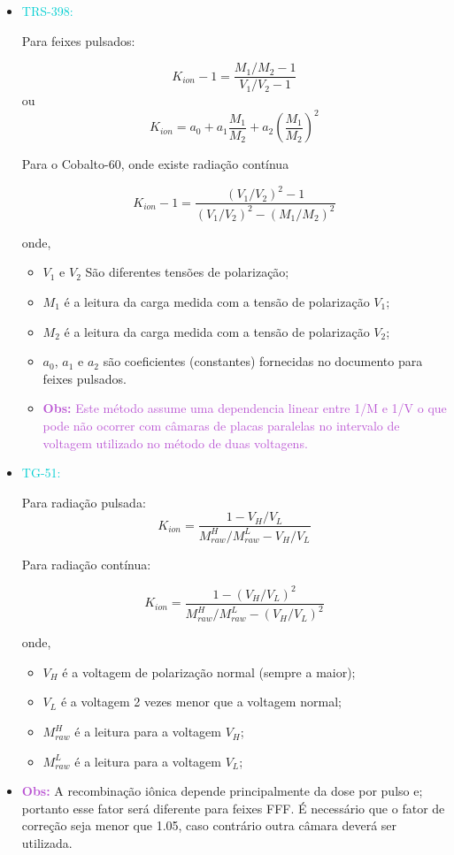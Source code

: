 \documentclass[11pt,a4paper]{article}
\newcounter{exemplo}
\begin{document}
	\begin{exemplo}
		\begin{itemize}
			\item \textcolor{DarkTurquoise}{TRS-398:}
			
			Para feixes pulsados:

				$$K_{ion} - 1 = \frac{M_1/M_2 - 1}{V_1/V_2 - 1}$$
			ou
				$$K_{ion} = a_0 + a_1\frac{M_1}{M_2} + a_2\left(\frac{M_1}{M_2}\right)^2$$

			Para o Cobalto-60, onde existe radiação contínua

				$$K_{ion} - 1 = \frac{(V_1/V_2)^2- 1}{(V_1/V_2)^2 - (M_1/M_2)^2}$$

			onde,
			\begin{itemize}[label=\textcolor{CarnationPink}{$\star$}]
				\item $V_1$ e $V_2$ São diferentes tensões de polarização;
				\item $M_1$ é a leitura da carga medida com a tensão de polarização $V_1$;
				\item $M_2$ é a leitura da carga medida com a tensão de polarização $V_2$;
				\item $a_0$, $a_1$ e $a_2$ são coeficientes (constantes) fornecidas no documento para feixes pulsados.
				\item \textcolor{MediumOrchid}{\textbf{Obs:} Este método assume uma dependencia linear entre 1/M e 1/V o que pode não ocorrer com câmaras de placas paralelas no intervalo de voltagem utilizado no método de duas voltagens.}
			\end{itemize}

			\item \textcolor{DarkTurquoise}{TG-51:}
			
			Para radiação pulsada:
				$$K_{ion} = \frac{1 - V_H/V_L}{M_{raw}^H/M_{raw}^L - V_H/V_L}$$

			Para radiação contínua:

				$$K_{ion} = \frac{1 - (V_H/V_L)^2}{M_{raw}^H/M_{raw}^L - (V_H/V_L)^2}$$

			onde,
			\begin{itemize}[label=\textcolor{CarnationPink}{$\star$}]
				\item $V_H$ é a voltagem de polarização normal (sempre a maior);
				\item $V_L$ é a voltagem 2 vezes menor que a voltagem normal;
				\item $M_{raw}^H$ é a leitura para a voltagem $V_H$;
				\item $M_{raw}^L$ é a leitura para a voltagem $V_L$;
			\end{itemize}

			\item \textcolor{MediumOrchid}{\textbf{Obs:}} A recombinação iônica depende principalmente da dose por pulso e; portanto esse fator será diferente para feixes FFF. É necessário que o fator de correção seja menor que 1.05, caso contrário outra câmara deverá ser utilizada.
		\end{itemize}
	\end{exemplo}
\end{document}
